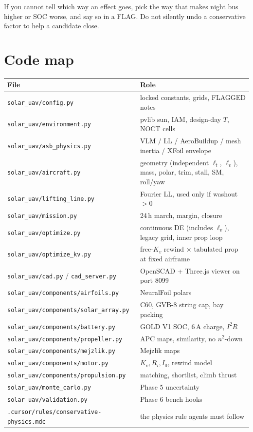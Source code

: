 \documentclass[11pt,letterpaper]{article}
\newcommand{\code}[1]{\texttt{#1}}
\begin{document}
If you cannot tell which way an effect goes, pick the way that makes night bus higher or SOC worse, and say so in a FLAG. Do not silently undo a conservative factor to help a candidate close.

\section{Code map}

\begin{center}
\begin{tabular}{@{}ll@{}}
\toprule
File & Role \\
\midrule
\code{solar\_uav/config.py} & locked constants, grids, FLAGGED notes \\
\code{solar\_uav/environment.py} & pvlib sun, IAM, design-day $T$, NOCT cells \\
\code{solar\_uav/asb\_physics.py} & VLM / LL / AeroBuildup / mesh inertia / XFoil envelope \\
\code{solar\_uav/aircraft.py} & geometry (independent $\ell_t$, $\ell_v$), mass, polar, trim, stall, SM, roll/yaw \\
\code{solar\_uav/lifting\_line.py} & Fourier LL, used only if washout $>0$ \\
\code{solar\_uav/mission.py} & 24\,h march, margin, closure \\
\code{solar\_uav/optimize.py} & continuous DE (includes $\ell_v$), legacy grid, inner prop loop \\
\code{solar\_uav/optimize\_kv.py} & free-$K_v$ rewind $\times$ tabulated prop at fixed airframe \\
\code{solar\_uav/cad.py} / \code{cad\_server.py} & OpenSCAD + Three.js viewer on port 8099 \\
\code{solar\_uav/components/airfoils.py} & NeuralFoil polars \\
\code{solar\_uav/components/solar\_array.py} & C60, GVB-8 string cap, bay packing \\
\code{solar\_uav/components/battery.py} & GOLD V1 SOC, 6\,A charge, $I^2R$ \\
\code{solar\_uav/components/propeller.py} & APC maps, similarity, no $n^2$-down \\
\code{solar\_uav/components/mejzlik.py} & Mejzlik maps \\
\code{solar\_uav/components/motor.py} & $K_v, R_i, I_0$, rewind model \\
\code{solar\_uav/components/propulsion.py} & matching, shortlist, climb thrust \\
\code{solar\_uav/monte\_carlo.py} & Phase 5 uncertainty \\
\code{solar\_uav/validation.py} & Phase 6 bench hooks \\
\code{.cursor/rules/conservative-physics.mdc} & the physics rule agents must follow \\
\bottomrule
\end{tabular}
\end{center}
\end{document}
